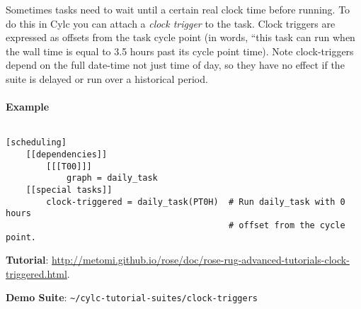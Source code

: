 Sometimes tasks need to wait until a certain real clock time before running. To
do this in Cylc you can attach a {\em clock trigger} to the task. Clock
triggers are expressed as offsets from the task cycle point (in words, ``this
task can run when the wall time is equal to 3.5 hours past its cycle point
time). Note clock-triggers depend on the full date-time not just time of day,
so they have no effect if the suite is delayed or run over a historical period.

\paragraph*{Example} $ $

\begin{lstlisting}
[scheduling]
    [[dependencies]]
        [[[T00]]]
            graph = daily_task
    [[special tasks]]
        clock-triggered = daily_task(PT0H)  # Run daily_task with 0 hours
                                            # offset from the cycle point.
\end{lstlisting}

\begin{shaded*}
\textbf{Tutorial}: \url{http://metomi.github.io/rose/doc/rose-rug-advanced-tutorials-clock-triggered.html}.

\textbf{Demo Suite}: \lstinline=~/cylc-tutorial-suites/clock-triggers=
\end{shaded*}


